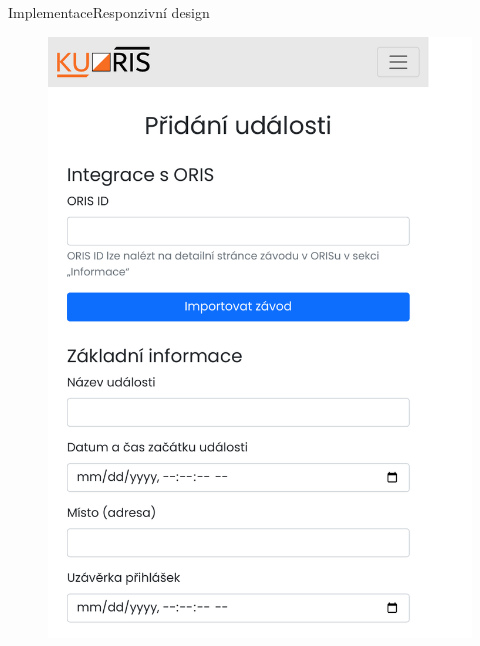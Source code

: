\documentclass[aspectratio=169]{beamer}
\begin{document}
\begin{frame}{Implementace}{Responzivní design}
\begin{figure}[h]
\begin{minipage}[b]{0.3\linewidth}
            \includegraphics[width=0.9\linewidth, cfbox=lightgray 0.5pt 0pt]{images/add-race.pdf}
        \end{minipage}
        \hfill
        \begin{minipage}[b]{0.3\linewidth}

\end{minipage}
\end{figure}
\end{frame}
\end{document}
